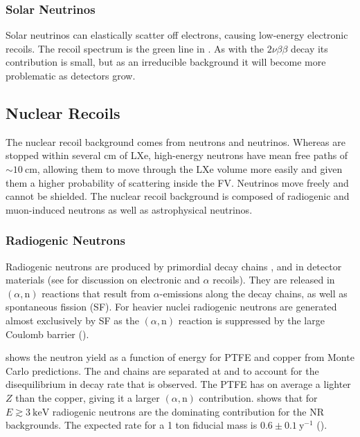 \subsubsection{Solar Neutrinos}
\label{subsubsec:backgrounds_electronic_solar_neutrinos}
Solar neutrinos can elastically scatter off electrons, causing low-energy electronic recoils.  The recoil spectrum is the green line in
.  As with the  $2 \nu \beta \beta$
decay its contribution is small, but as an irreducible background it will become more problematic as detectors grow.



\subsection{Nuclear Recoils}
\label{subsec:backgrounds_nuclear}
The nuclear recoil background comes from neutrons and neutrinos.  Whereas \gammarays are stopped within several cm of LXe, high-energy
neutrons have mean free paths of ${\sim}10\ \mathrm{cm}$, allowing them to move through the LXe volume more easily and given them a higher
probability of scattering inside the FV.  Neutrinos move freely and cannot be shielded.  The nuclear recoil background is composed of
radiogenic and muon-induced neutrons as well as astrophysical neutrinos.



\subsubsection{Radiogenic Neutrons}
\label{subsubsec:backgrounds_nuclear_radiogenic}
Radiogenic neutrons are produced by primordial decay chains ,  and  in detector materials
(see  for discussion on electronic and $\alpha$ recoils).  They are released in
$(\alpha, \mathrm{n})$ reactions that result from $\alpha$-emissions along the decay chains, as well as spontaneous fission (SF).  For
heavier nuclei radiogenic neutrons are generated almost exclusively by SF as the $(\alpha, \mathrm{n})$ reaction is suppressed by the
large Coulomb barrier ().

 shows the neutron yield as a function of energy for PTFE and copper from Monte Carlo
predictions.  The  and  chains are
separated at  and  to account for the disequilibrium in decay rate
that is observed.  The PTFE has on average a lighter $Z$ than the copper, giving it a larger $(\alpha, \mathrm{n})$
contribution.   shows that for $E \gtrsim 3\ \mathrm{keV}$
radiogenic neutrons are the dominating contribution for the NR backgrounds.  The expected rate for a 1 ton fiducial mass is
$0.6 \pm 0.1\ \mathrm{y^{-1}}$ ().


